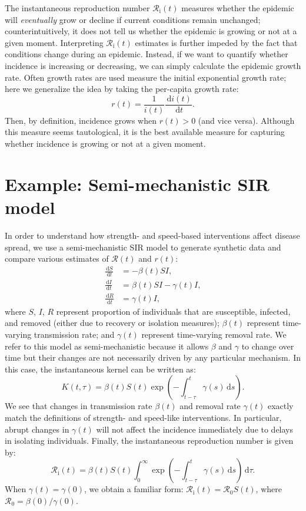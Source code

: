\documentclass[12pt]{article}
\newcommand{\Rx}[1]{\ensuremath{{\mathcal R}_{#1}}\xspace}
\newcommand{\Ro}{\Rx{0}}
\newcommand{\Ri}{\Rx{\mathrm{i}}}
\newcommand{\RR}{\ensuremath{{\mathcal R}}\xspace}
\newcommand{\dd}[1]{\ensuremath{\, \mathrm{d}#1}}
\newcommand{\dtau}{\dd{\tau}}
\begin{document}
The instantaneous reproduction number $\Ri(t)$ measures whether the epidemic will \emph{eventually} grow or decline if current conditions remain unchanged;
counterintuitively, it does not tell us whether the epidemic is growing or not at a given moment.
Interpreting $\Ri(t)$ estimates is further impeded by the fact that conditions change during an epidemic.
Instead, if we want to quantify whether incidence is increasing or decreasing, we can simply calculate the epidemic growth rate.
Often growth rates are used measure the initial exponential growth rate; here we generalize the idea by taking the per-capita growth rate:
\begin{equation}
r(t) = \frac{1}{i(t)} \frac{\dd{i(t)}}{\dd{t}}.
\end{equation}
Then, by definition, incidence grows when $r(t) > 0$ (and vice versa).
Although this measure seems tautological, it is the best available measure for capturing whether incidence is growing or not at a given moment.

\section{Example: Semi-mechanistic SIR model}

In order to understand how strength- and speed-based interventions affect disease spread, we use a semi-mechanistic SIR model to generate synthetic data and compare various estimates of $\RR(t)$ and $r(t)$:
\begin{align}
\frac{\dd{S}}{\dd{t}} &= - \beta(t)S I,\\
\frac{\dd{I}}{\dd{t}} &= \beta(t)S I - \gamma(t) I,\\
\frac{\dd{R}}{\dd{t}} &= \gamma(t) I,
\end{align}
where $S$, $I$, $R$ represent proportion of individuals that are susceptible, infected, and removed (either due to recovery or isolation measures);
$\beta(t)$ represent time-varying transmission rate; and $\gamma(t)$ represent time-varying removal rate.
We refer to this model as semi-mechanistic because it allows $\beta$ and $\gamma$ to change over time but their changes are not necessarily driven by any particular mechanism.
In this case, the instantaneous kernel can be written as:
\begin{equation}
K(t, \tau) = \beta(t) S(t) \exp\left(-\int_{t-\tau}^t \gamma(s) \dd{s} \right).
\end{equation}
We see that changes in transmission rate $\beta(t)$ and removal rate $\gamma(t)$ exactly match the definitions of strength- and speed-like interventions.
In particular, abrupt changes in $\gamma(t)$ will not affect the incidence immediately due to delays in isolating individuals.
Finally, the instantaneous reproduction number is given by:
\begin{equation}
\Ri(t) = \beta(t) S(t) \int_0^\infty \exp\left(-\int_{t-\tau}^t \gamma(s) \dd{s} \right) \dtau.
\end{equation}
When $\gamma(t) = \gamma(0)$, we obtain a familiar form: $\Ri(t) = \Ro S(t)$,
where $\Ro = \beta(0)/\gamma(0)$.
\end{document}
